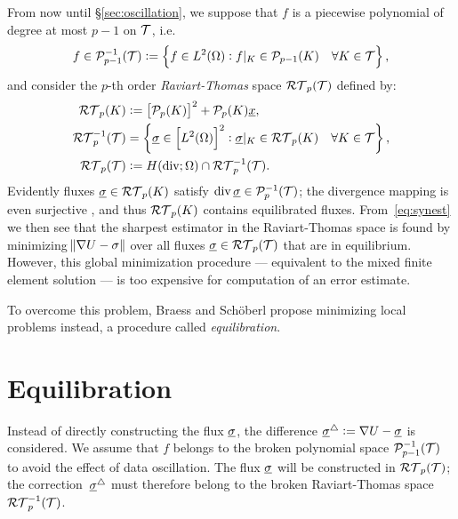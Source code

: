 \documentclass[thesis.tex]{subfiles}
\begin{document}
From now until \S\ref{sec:oscillation}, we suppose that $f$ is a piecewise polynomial of degree at most $p-1$ on $\mathcal{T}$, i.e.
\[
  f\in \mathcal{P}_{p-1}^{-1}(\mathcal{T}) := \set{ f \in L^2(\Omega): f|_K \in \mathcal{P}_{p-1}(K) \quad \forall K \in \mathcal{T}},
\]
and consider the  $p$-th order \emph{Raviart-Thomas} \cite{raviart1977mixed}  space $\mathcal{RT}_p(\mathcal{T})$ defined by:
\begin{align*} 
  \mathcal{RT}_p(K)    &:= \left[ \mathcal{P}_p(K)\right]^2 + \mathcal{P}_p(K)\underline{x}, \\
  \mathcal{RT}_p^{-1}(\mathcal{T}) &= \set{ \underline{\sigma} \in \left[L^2(\Omega)\right]^2 : \underline{\sigma}|_K \in \mathcal{RT}_p(K) \quad \forall K \in \mathcal{T}},\\
  \mathcal{RT}_p(\mathcal{T}) &:= H(\operatorname{div}; \Omega) \cap \mathcal{RT}_p^{-1}(\mathcal{T}).
\end{align*}
Evidently fluxes $\underline{\sigma} \in \mathcal{RT}_p(K)$ satisfy $\operatorname{div} \underline{\sigma} \in \mathcal{P}_p^{-1}(\mathcal{T})$; the divergence mapping
is even surjective \cite[Prop~2.3.3]{brezzimixed}, and thus $\mathcal{RT}_p(K)$ contains equilibrated fluxes.
 From~\eqref{eq:synest} we then see that 
the sharpest estimator in the Raviart-Thomas space is found by minimizing $\norm{\nabla U - \sigma}$ over all 
fluxes $\underline{\sigma} \in \mathcal{RT}_p(\mathcal{T})$ that are in equilibrium. However,
this global minimization procedure --- equivalent to the mixed finite element solution \cite{braess2007finite} --- 
is too expensive for computation of an error estimate.

To overcome this problem, Braess and Sch\"oberl \cite{braessequil} propose minimizing local problems instead, a procedure
called \emph{equilibration}.

\section{Equilibration} 
Instead of directly constructing the flux $\underline{\sigma}$, the difference $\underline{\sigma}^\triangle := \nabla U -  \underline{\sigma}$ is considered.
We assume that $f$ belongs to the broken polynomial space $\mathcal{P}_{p-1}^{-1}(\mathcal{T})$ to avoid the effect of
data oscillation.  The flux $\underline{\sigma}$ will be constructed in $\mathcal{RT}_p(\mathcal{T})$; the correction~$\underline{\sigma}^\triangle$ must 
therefore belong to the broken Raviart-Thomas space $\mathcal{RT}_p^{-1}(\mathcal{T})$.
\end{document}
